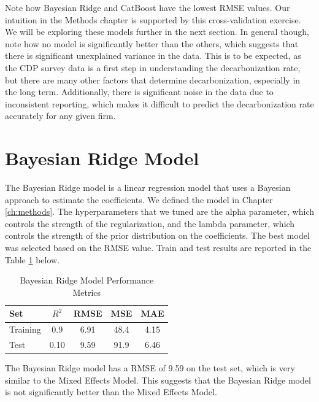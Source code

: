 

\noindent Note how Bayesian Ridge and CatBoost have the lowest RMSE values. Our intuition in the Methods chapter is supported by this cross-validation exercise. We will be exploring these models further in the next section. In general though, note how no model is significantly better than the others, which suggests that there is significant unexplained variance in the data. This is to be expected, as the CDP survey data is a first step in understanding the decarbonization rate, but there are many other factors that determine decarbonization, especially in the long term. Additionally, there is significant noise in the data due to inconsistent reporting, which makes it difficult to predict the decarbonization rate accurately for any given firm. 

\section{Bayesian Ridge Model}

The Bayesian Ridge model is a linear regression model that uses a Bayesian approach to estimate the coefficients. We defined the model in Chapter \ref{ch:methods}. The hyperparameters that we tuned are the alpha parameter, which controls the strength of the regularization, and the lambda parameter, which controls the strength of the prior distribution on the coefficients. The best model was selected based on the RMSE value. Train and test results are reported in the Table \ref{tab:bayesian_ridge_performance} below. 

\begin{table}[H]
    \centering
    \caption{Bayesian Ridge Model Performance Metrics}
    \label{tab:bayesian_ridge_performance}
    \begin{tabular}{lcccc}
    \hline
    Set & $R^2$ & RMSE & MSE & MAE \\ 
    \hline
    Training & 0.9 & 6.91 & 48.4 & 4.15 \\
    Test & 0.10 & 9.59 & 91.9 & 6.46 \\
    \hline
    \end{tabular}
\end{table}
\noindent The Bayesian Ridge model has a RMSE of 9.59 on the test set, which is very similar to the Mixed Effects Model. This suggests that the Bayesian Ridge model is not significantly better than the Mixed Effects Model. 

